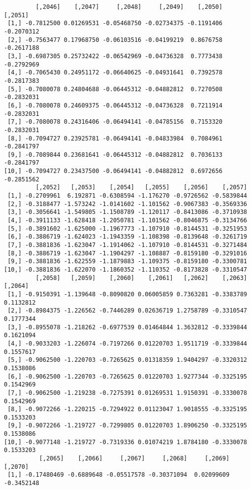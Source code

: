 \documentclass[
  letterpaper,
  DIV=11,
  numbers=noendperiod]{scrreprt}
\begin{document}
\begin{verbatim}
         [,2046]    [,2047]     [,2048]     [,2049]    [,2050]    [,2051]
 [1,] -0.7812500 0.01269531 -0.05468750 -0.02734375 -0.1191406 -0.2070312
 [2,] -0.7563477 0.17968750 -0.06103516 -0.04199219  0.8676758 -0.2617188
 [3,] -0.6987305 0.25732422 -0.06542969 -0.04736328  0.7773438 -0.2792969
 [4,] -0.7065430 0.24951172 -0.06640625 -0.04931641  0.7392578 -0.2817383
 [5,] -0.7080078 0.24804688 -0.06445312 -0.04882812  0.7270508 -0.2832031
 [6,] -0.7080078 0.24609375 -0.06445312 -0.04736328  0.7211914 -0.2832031
 [7,] -0.7080078 0.24316406 -0.06494141 -0.04785156  0.7153320 -0.2832031
 [8,] -0.7094727 0.23925781 -0.06494141 -0.04833984  0.7084961 -0.2841797
 [9,] -0.7089844 0.23681641 -0.06445312 -0.04882812  0.7036133 -0.2841797
[10,] -0.7094727 0.23437500 -0.06494141 -0.04882812  0.6972656 -0.2851562
         [,2052]   [,2053]    [,2054]   [,2055]    [,2056]    [,2057]
 [1,] -0.2709961  6.192871 -0.6308594 -1.176270 -0.9726562 -0.5839844
 [2,] -0.3188477 -1.573242 -1.0141602 -1.101562 -0.9067383 -0.3569336
 [3,] -0.3056641 -1.549805 -1.1508789 -1.120117 -0.8413086 -0.3710938
 [4,] -0.3911133 -1.628418 -1.2050781 -1.101562 -0.8046875 -0.3134766
 [5,] -0.3891602 -1.625000 -1.1967773 -1.107910 -0.8144531 -0.3251953
 [6,] -0.3886719 -1.624023 -1.1943359 -1.108398 -0.8139648 -0.3261719
 [7,] -0.3881836 -1.623047 -1.1914062 -1.107910 -0.8144531 -0.3271484
 [8,] -0.3886719 -1.623047 -1.1904297 -1.108887 -0.8159180 -0.3291016
 [9,] -0.3881836 -1.622559 -1.1879883 -1.109375 -0.8159180 -0.3300781
[10,] -0.3881836 -1.622070 -1.1860352 -1.110352 -0.8173828 -0.3310547
         [,2058]   [,2059]    [,2060]    [,2061]   [,2062]    [,2063]   [,2064]
 [1,] -0.9150391 -1.139648 -0.8090820 0.06005859 0.7363281 -0.3383789 0.1132812
 [2,] -0.8984375 -1.226562 -0.7446289 0.02636719 1.2758789 -0.3310547 0.1777344
 [3,] -0.8955078 -1.218262 -0.6977539 0.01464844 1.3632812 -0.3339844 0.1621094
 [4,] -0.9033203 -1.226074 -0.7197266 0.01220703 1.9511719 -0.3339844 0.1557617
 [5,] -0.9062500 -1.220703 -0.7265625 0.01318359 1.9404297 -0.3320312 0.1538086
 [6,] -0.9062500 -1.220703 -0.7265625 0.01220703 1.9277344 -0.3325195 0.1542969
 [7,] -0.9062500 -1.219238 -0.7275391 0.01269531 1.9150391 -0.3330078 0.1542969
 [8,] -0.9072266 -1.220215 -0.7294922 0.01123047 1.9018555 -0.3325195 0.1533203
 [9,] -0.9072266 -1.219727 -0.7299805 0.01220703 1.8906250 -0.3325195 0.1538086
[10,] -0.9077148 -1.219727 -0.7319336 0.01074219 1.8784180 -0.3330078 0.1533203
          [,2065]    [,2066]     [,2067]     [,2068]     [,2069]    [,2070]
 [1,] -0.17480469 -0.6889648 -0.05517578 -0.30371094  0.02099609 -0.3452148

\end{verbatim}
\end{document}

